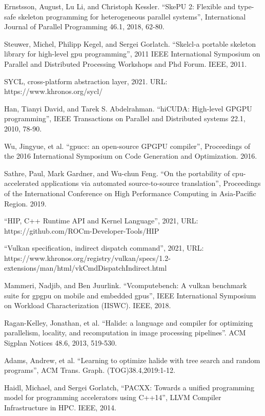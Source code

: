 \documentclass[11pt,fleqn,english,russian]{report} %
\begin{document}
\begin{thebibliography}{10}
	 Ernstsson, August, Lu Li, and Christoph Kessler. ``SkePU 2: Flexible and type-safe skeleton programming for heterogeneous parallel systems'', International Journal of Parallel Programming 46.1, 2018, 62-80. 
	
	 Steuwer, Michel, Philipp Kegel, and Sergei Gorlatch. ``Skelcl-a portable skeleton library for high-level gpu programming'', 2011 IEEE International Symposium on Parallel and Distributed Processing Workshops and Phd Forum. IEEE, 2011. 
	
	 SYCL, cross-platform abstraction layer, 2021. URL: https://www.khronos.org/sycl/	
	
	
	 Han, Tianyi David, and Tarek S. Abdelrahman. ``hiCUDA: High-level GPGPU programming'', IEEE Transactions on Parallel and Distributed systems 22.1, 2010, 78-90. 	
	
	 Wu, Jingyue, et al. ``gpucc: an open-source GPGPU compiler'', Proceedings of the 2016 International Symposium on Code Generation and Optimization. 2016. 	
	
	 Sathre, Paul, Mark Gardner, and Wu-chun Feng. ``On the portability of cpu-accelerated applications via automated source-to-source translation'', Proceedings of the International Conference on High Performance Computing in Asia-Pacific Region. 2019.
	
	 ``HIP, C++ Runtime API and Kernel Language'', 2021, URL: https://github.com/ROCm-Developer-Tools/HIP	
	
	 ``Vulkan specification, indirect dispatch command'', 2021, URL: https://www.khronos.org/registry/vulkan/specs/1.2-extensions/man/html/vkCmdDispatchIndirect.html
	
	 Mammeri, Nadjib, and Ben Juurlink. ``Vcomputebench: A vulkan benchmark suite for gpgpu on mobile and embedded gpus'', IEEE International Symposium on Workload Characterization (IISWC). IEEE, 2018. 
	
	 Ragan-Kelley, Jonathan, et al. ``Halide: a language and compiler for optimizing parallelism, locality, and recomputation in image processing pipelines''. ACM Sigplan Notices 48.6, 2013, 519-530. 
	
	 Adams, Andrew, et al. ``Learning to optimize halide with tree search and random programs'', ACM Trans. Graph. (TOG)38.4,2019:1-12. 
	
	 Haidl, Michael, and Sergei Gorlatch, ``PACXX: Towards a unified programming model for programming accelerators using C++14'', LLVM Compiler Infrastructure in HPC. IEEE, 2014.
	

\end{thebibliography}
\end{document}

